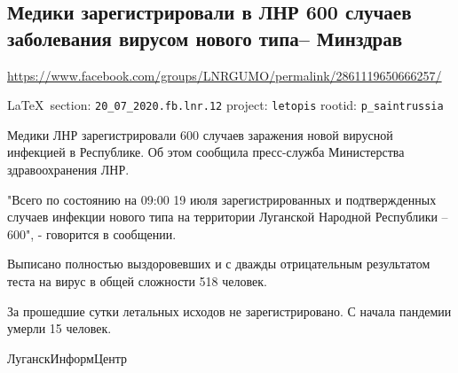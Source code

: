  
 

\subsection{Медики зарегистрировали в ЛНР 600 случаев заболевания вирусом нового типа– Минздрав}
\url{https://www.facebook.com/groups/LNRGUMO/permalink/2861119650666257/}
  
\vspace{0.5cm}
{\small\LaTeX~section: \verb|20_07_2020.fb.lnr.12| project: \verb|letopis| rootid: \verb|p_saintrussia|}
\vspace{0.5cm}

Медики ЛНР зарегистрировали 600 случаев заражения новой вирусной инфекцией в
Республике. Об этом сообщила пресс-служба Министерства здравоохранения ЛНР.

"Всего по состоянию на 09:00 19 июля зарегистрированных и подтвержденных
случаев инфекции нового типа на территории Луганской Народной Республики –
600", - говорится в сообщении.

Выписано полностью выздоровевших и с дважды отрицательным результатом теста на
вирус в общей сложности 518 человек.

За прошедшие сутки летальных исходов не зарегистрировано. С начала пандемии
умерли 15 человек.

ЛуганскИнформЦентр 
